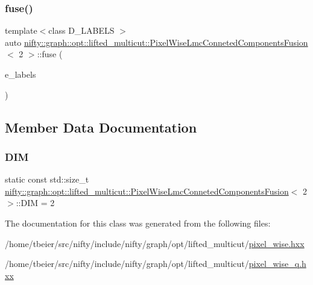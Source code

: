 \subsubsection{\texorpdfstring{fuse()}{fuse()}\hspace{0.1cm}{\footnotesize\ttfamily [4/4]}}
{\footnotesize\ttfamily template$<$class D\+\_\+\+L\+A\+B\+E\+LS $>$ \\
auto \hyperlink{classnifty_1_1graph_1_1opt_1_1lifted__multicut_1_1PixelWiseLmcConnetedComponentsFusion}{nifty\+::graph\+::opt\+::lifted\+\_\+multicut\+::\+Pixel\+Wise\+Lmc\+Conneted\+Components\+Fusion}$<$ 2 $>$\+::fuse (\begin{DoxyParamCaption}\item[{const xt\+::xexpression$<$ D\+\_\+\+L\+A\+B\+E\+LS $>$ \&}]{e\+\_\+labels }\end{DoxyParamCaption})\hspace{0.3cm}{\ttfamily [inline]}}



\subsection{Member Data Documentation}
\mbox{\label{classnifty_1_1graph_1_1opt_1_1lifted__multicut_1_1PixelWiseLmcConnetedComponentsFusion_3_012_01_4_aa53357c01823259e7ac1216f1211a531}} 
\subsubsection{\texorpdfstring{D\+IM}{DIM}}
{\footnotesize\ttfamily static const std\+::size\+\_\+t \hyperlink{classnifty_1_1graph_1_1opt_1_1lifted__multicut_1_1PixelWiseLmcConnetedComponentsFusion}{nifty\+::graph\+::opt\+::lifted\+\_\+multicut\+::\+Pixel\+Wise\+Lmc\+Conneted\+Components\+Fusion}$<$ 2 $>$\+::D\+IM = 2\hspace{0.3cm}{\ttfamily [static]}}



The documentation for this class was generated from the following files\+:\begin{DoxyCompactItemize}
\item 
/home/tbeier/src/nifty/include/nifty/graph/opt/lifted\+\_\+multicut/\hyperlink{pixel__wise_8hxx}{pixel\+\_\+wise.\+hxx}\item 
/home/tbeier/src/nifty/include/nifty/graph/opt/lifted\+\_\+multicut/\hyperlink{pixel__wise__q_8hxx}{pixel\+\_\+wise\+\_\+q.\+hxx}\end{DoxyCompactItemize}
